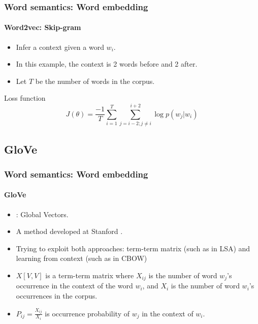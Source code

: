 \documentclass[xcolor=table]{beamer}
\begin{document}
\begin{frame}
	\frametitle{Word semantics: Word embedding}
	\framesubtitle{Word2vec: Skip-gram}
	\begin{minipage}{.58\textwidth}
		\begin{itemize}
			\item Infer a context given a word $w_i$.
			\item In this example, the context is 2 words before and 2 after.
			\item Let $T$ be the number of words in the corpus.
		\end{itemize}
		\begin{block}{Loss function}
			\[%
			J(\theta) = \frac{-1}{T} \sum_{i=1}^{T} \sum_{j= i-2; j \ne i}^{i+2} \log p(w_j |w_i)
			\]
		\end{block}
	\end{minipage}
	\begin{minipage}{.4\textwidth}
	\end{minipage}
	
\end{frame}

\subsection{GloVe}

\begin{frame}
\frametitle{Word semantics: Word embedding}
\framesubtitle{GloVe}

\begin{itemize}
	\item {}: Global Vectors.
	\item A method developed at Stanford \cite{2014-pennington-al}.
	\item Trying to exploit both approaches: term-term matrix (such as in LSA) and learning from context (such as in CBOW)
	\item $X[V, V]$ is a term-term matrix where $X_{ij}$ is the number of word $w_j$'s occurrence in the context of the word $w_i$, and $X_i$ is the number of word $w_i$'s occurrences in the corpus.
	\item $P_{ij} = \frac{X_{ij}}{X_i}$ is occurrence probability of $w_j$ in the context of $w_i$.
\end{itemize}

\end{frame}
\end{document}
